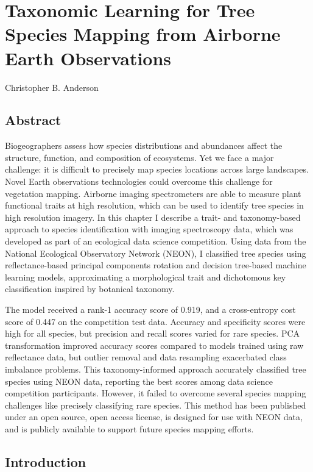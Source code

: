 \chapter[Taxonomic Learning for Tree Species Mapping]{Taxonomic Learning for Tree Species Mapping from Airborne Earth Observations}

Christopher B. Anderson

\section{Abstract}

Biogeographers assess how species distributions and abundances affect the structure, function, and composition of ecosystems. Yet we face a major challenge: it is difficult to precisely map species locations across large landscapes. Novel Earth observations technologies could overcome this challenge for vegetation mapping. Airborne imaging spectrometers are able to measure plant functional traits at high resolution, which can be used to identify tree species in high resolution imagery. In this chapter I describe a trait- and taxonomy-based approach to species identification with imaging spectroscopy data, which was developed as part of an ecological data science competition. Using data from the National Ecological Observatory Network (NEON), I classified tree species using reflectance-based principal components rotation and decision tree-based machine learning models, approximating a morphological trait and dichotomous key classification inspired by botanical taxonomy.

The model received a rank-1 accuracy score of 0.919, and a cross-entropy cost score of 0.447 on the competition test data. Accuracy and specificity scores were high for all species, but precision and recall scores varied for rare species. PCA transformation improved accuracy scores compared to models trained using raw reflectance data, but outlier removal and data resampling exacerbated class imbalance problems. This taxonomy-informed approach accurately classified tree species using NEON data, reporting the best scores among data science competition participants. However, it failed to overcome several species mapping challenges like precisely classifying rare species. This method has been published under an open source, open access license, is designed for use with NEON data, and is publicly available to support future species mapping efforts.

\section{Introduction}

